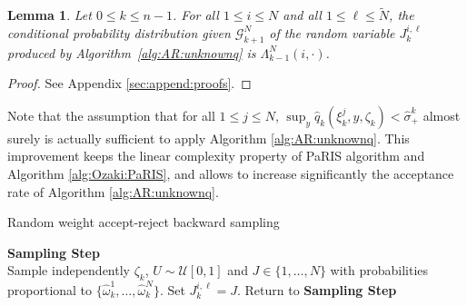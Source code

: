\documentclass[12pt]{article}
\newcommand{\eqsp}{\;}
\newcommand{\1}{\mathrm{1}}
\newcommand{\qk}{q_{k}}
\newtheorem{lemma}{Lemma}
\begin{document}
\begin{lemma}
\label{lem:AR:unbiased}
Let $0\le k\le n-1$.  For all $1\le i \le N$ and all $1\le \ell \le \widetilde{N}$, the conditional probability distribution given $\mathcal{G}_{k+1}^N$ of the random variable $J_{k}^{i,\ell}$ produced by Algorithm~\ref{alg:AR:unknownq} is  $\Lambda_{k-1}^N(i,\cdot)$. 
\end{lemma}
\begin{proof}
See Appendix \ref{sec:append:proofs}.
\end{proof}
Note that the assumption that for all $1\le j\le N$, $\sup_y \hat{q}_k(\xi_k^j,y,\zeta_k)< \hat{\sigma}_+^k$ almost surely is actually sufficient to apply Algorithm \ref{alg:AR:unknownq}. This improvement keeps the linear complexity property of PaRIS algorithm and Algorithm \ref{alg:Ozaki:PaRIS}, and allows to increase significantly the acceptance rate of Algorithm \ref{alg:AR:unknownq}. %
\begin{algorithm}[H]
\caption{Random weight accept-reject backward sampling}
\begin{algorithmic}
\STATE \textbf{\sc Sampling Step} \\
Sample independently $
\zeta_k$, $U\sim \mathcal{U}[0,1]$ and $J\in\{1,\ldots,N\}$ with probabilities proportional to $\{\widehat{\omega}_{k}^1,\dots,\widehat{\omega}_{k}^N\}$.
\IF{ $$U \leq \frac{\widehat{\qk}(\xi_{k}^J,\xi_{k+1}^i,\zeta_k)}{\hat{\sigma}_+},$$}
\STATE Set $J_k^{i,\ell} = J$.
\ELSE 
\STATE Return to \textbf{\sc Sampling Step}
\ENDIF
\ENDFOR
\ENDFOR
\end{algorithmic}
\label{alg:AR:unknownq}
\end{algorithm}
\end{document}
